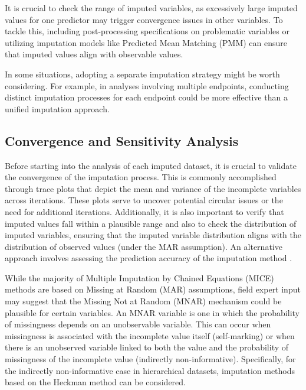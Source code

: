 \documentclass[
  article]{jss}
\begin{document}
It is crucial to check the range of imputed variables, as excessively
large imputed values for one predictor may trigger convergence issues in
other variables. To tackle this, including post-processing
specifications on problematic variables or utilizing imputation models
like Predicted Mean Matching (PMM) can ensure that imputed values align
with observable values.

In some situations, adopting a separate imputation strategy might be
worth considering. For example, in analyses involving multiple
endpoints, conducting distinct imputation processes for each endpoint
could be more effective than a unified imputation approach.

\hypertarget{convergence-and-sensitivity-analysis}{%
\subsection{Convergence and Sensitivity
Analysis}\label{convergence-and-sensitivity-analysis}}

Before starting into the analysis of each imputed dataset, it is crucial
to validate the convergence of the imputation process. This is commonly
accomplished through trace plots that depict the mean and variance of
the incomplete variables across iterations. These plots serve to uncover
potential circular issues or the need for additional iterations.
Additionally, it is also important to verify that imputed values fall
within a plausible range and also to check the distribution of imputed
variables, ensuring that the imputed variable distribution aligns with
the distribution of observed values (under the MAR assumption). An
alternative approach involves assessing the prediction accuracy of the
imputation method \cite{cai2023}.

While the majority of Multiple Imputation by Chained Equations (MICE)
methods are based on Missing at Random (MAR) assumptions, field expert
input may suggest that the Missing Not at Random (MNAR) mechanism could
be plausible for certain variables. An MNAR variable is one in which the
probability of missingness depends on an unobservable variable. This can
occur when missingness is associated with the incomplete value itself
(self-marking) or when there is an unobserved variable linked to both
the value and the probability of missingness of the incomplete value
(indirectly non-informative). Specifically, for the indirectly
non-informative case in hierarchical datasets, imputation methods based
on the Heckman method can be
considered.\cite{hammon2020,hammon2022,munoz2023}
\end{document}
